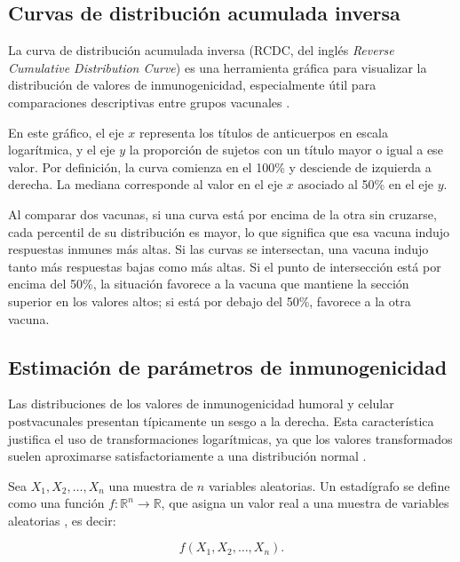 \subsection{Curvas de distribución acumulada inversa}

La curva de distribución acumulada inversa (RCDC, del inglés \textit{Reverse Cumulative Distribution Curve}) es una herramienta gráfica para visualizar la distribución de valores de inmunogenicidad, especialmente útil para comparaciones descriptivas entre grupos vacunales \cite{nauta2020}.

En este gráfico, el eje $x$ representa los títulos de anticuerpos en escala logarítmica, y el eje $y$ la proporción de sujetos con un título mayor o igual a ese valor. Por definición, la curva comienza en el 100\% y desciende de izquierda a derecha. La mediana corresponde al valor en el eje $x$ asociado al 50\% en el eje $y$.

Al comparar dos vacunas, si una curva está por encima de la otra sin cruzarse, cada percentil de su distribución es mayor, lo que significa que esa vacuna indujo respuestas inmunes más altas. Si las curvas se intersectan, una vacuna indujo tanto más respuestas bajas como más altas. Si el punto de intersección está por encima del 50\%, la situación favorece a la vacuna que mantiene la sección superior en los valores altos; si está por debajo del 50\%, favorece a la otra vacuna.

\subsection{Estimación de parámetros de inmunogenicidad}

Las distribuciones de los valores de inmunogenicidad humoral y celular postvacunales presentan típicamente un sesgo a la derecha. Esta característica justifica el uso de transformaciones logarítmicas, ya que los valores transformados suelen aproximarse satisfactoriamente a una distribución normal \cite{nauta2020}.  

\begin{definition}  
	Sea $X_1,X_2,\ldots,X_n$ una muestra de $n$ variables aleatorias. Un estadígrafo se define como una función $f:\mathbb{R}^n \to \mathbb{R}$, que asigna un valor real a una muestra de variables aleatorias \cite{nauta2020}, es decir:
	
	\begin{equation}
		\label{eq:estadístico}
		f(X_1,X_2,\ldots,X_n).
	\end{equation}
	
\end{definition} 

